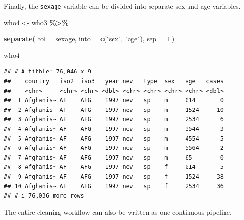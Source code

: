 \documentclass[
  11pt,
  oneside]{book}
\newenvironment{Shaded}{\begin{snugshade}}{\end{snugshade}}
\newcommand{\AttributeTok}[1]{\textcolor[rgb]{0.13,0.29,0.53}{#1}}
\newcommand{\DecValTok}[1]{\textcolor[rgb]{0.00,0.00,0.81}{#1}}
\newcommand{\FunctionTok}[1]{\textcolor[rgb]{0.13,0.29,0.53}{\textbf{#1}}}
\newcommand{\NormalTok}[1]{#1}
\newcommand{\OtherTok}[1]{\textcolor[rgb]{0.56,0.35,0.01}{#1}}
\newcommand{\SpecialCharTok}[1]{\textcolor[rgb]{0.81,0.36,0.00}{\textbf{#1}}}
\newcommand{\StringTok}[1]{\textcolor[rgb]{0.31,0.60,0.02}{#1}}
\begin{document}
Finally, the \texttt{sexage} variable can be divided into separate sex and age variables.

\begin{Shaded}
\begin{Highlighting}[]
\NormalTok{who4 }\OtherTok{\textless{}{-}}\NormalTok{ who3 }\SpecialCharTok{\%\textgreater{}\%}
  
  \FunctionTok{separate}\NormalTok{(}
    \AttributeTok{col =}\NormalTok{ sexage,}
    \AttributeTok{into =} \FunctionTok{c}\NormalTok{(}\StringTok{"sex"}\NormalTok{, }\StringTok{"age"}\NormalTok{),}
    \AttributeTok{sep =} \DecValTok{1}
\NormalTok{  )}

\NormalTok{who4}
\end{Highlighting}
\end{Shaded}

\begin{verbatim}
## # A tibble: 76,046 x 9
##    country   iso2  iso3   year new   type  sex   age   cases
##    <chr>     <chr> <chr> <dbl> <chr> <chr> <chr> <chr> <dbl>
##  1 Afghanis~ AF    AFG    1997 new   sp    m     014       0
##  2 Afghanis~ AF    AFG    1997 new   sp    m     1524     10
##  3 Afghanis~ AF    AFG    1997 new   sp    m     2534      6
##  4 Afghanis~ AF    AFG    1997 new   sp    m     3544      3
##  5 Afghanis~ AF    AFG    1997 new   sp    m     4554      5
##  6 Afghanis~ AF    AFG    1997 new   sp    m     5564      2
##  7 Afghanis~ AF    AFG    1997 new   sp    m     65        0
##  8 Afghanis~ AF    AFG    1997 new   sp    f     014       5
##  9 Afghanis~ AF    AFG    1997 new   sp    f     1524     38
## 10 Afghanis~ AF    AFG    1997 new   sp    f     2534     36
## # i 76,036 more rows
\end{verbatim}

The entire cleaning workflow can also be written as one continuous pipeline.
\end{document}

